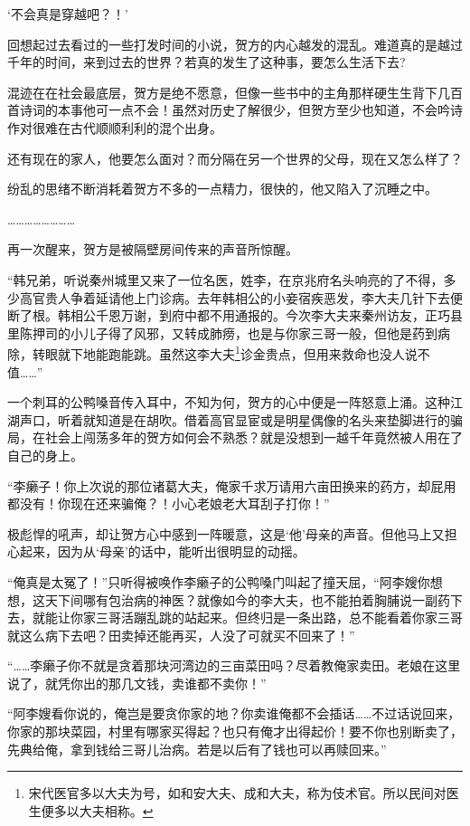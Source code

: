 ‘不会真是穿越吧？！’

回想起过去看过的一些打发时间的小说，贺方的内心越发的混乱。难道真的是越过千年的时间，来到过去的世界？若真的发生了这种事，要怎么生活下去?

混迹在在社会最底层，贺方是绝不愿意，但像一些书中的主角那样硬生生背下几百首诗词的本事他可一点不会！虽然对历史了解很少，但贺方至少也知道，不会吟诗作对很难在古代顺顺利利的混个出身。

还有现在的家人，他要怎么面对？而分隔在另一个世界的父母，现在又怎么样了？

纷乱的思绪不断消耗着贺方不多的一点精力，很快的，他又陷入了沉睡之中。

……………………

再一次醒来，贺方是被隔壁房间传来的声音所惊醒。

“韩兄弟，听说秦州城里又来了一位名医，姓李，在京兆府名头响亮的了不得，多少高官贵人争着延请他上门诊病。去年韩相公的小妾宿疾恶发，李大夫几针下去便断了根。韩相公千恩万谢，到府中都不用通报的。今次李大夫来秦州访友，正巧县里陈押司的小儿子得了风邪，又转成肺痨，也是与你家三哥一般，但他是药到病除，转眼就下地能跑能跳。虽然这李大夫\footnote{宋代医官多以大夫为号，如和安大夫、成和大夫，称为伎术官。所以民间对医生便多以大夫相称。}诊金贵点，但用来救命也没人说不值……”

一个刺耳的公鸭嗓音传入耳中，不知为何，贺方的心中便是一阵怒意上涌。这种江湖声口，听着就知道是在胡吹。借着高官显宦或是明星偶像的名头来垫脚进行的骗局，在社会上闯荡多年的贺方如何会不熟悉？就是没想到一越千年竟然被人用在了自己的身上。

“李癞子！你上次说的那位诸葛大夫，俺家千求万请用六亩田换来的药方，却屁用都没有！你现在还来骗俺？！小心老娘老大耳刮子打你！”

极彪悍的吼声，却让贺方心中感到一阵暖意，这是‘他’母亲的声音。但他马上又担心起来，因为从‘母亲’的话中，能听出很明显的动摇。

“俺真是太冤了！”只听得被唤作李癞子的公鸭嗓门叫起了撞天屈，“阿李嫂你想想，这天下间哪有包治病的神医？就像如今的李大夫，也不能拍着胸脯说一副药下去，就能让你家三哥活蹦乱跳的站起来。但终归是一条出路，总不能看着你家三哥就这么病下去吧？田卖掉还能再买，人没了可就买不回来了！”

“……李癞子你不就是贪着那块河湾边的三亩菜田吗？尽着教俺家卖田。老娘在这里说了，就凭你出的那几文钱，卖谁都不卖你！”

“阿李嫂看你说的，俺岂是要贪你家的地？你卖谁俺都不会插话……不过话说回来，你家的那块菜园，村里有哪家买得起？也只有俺才出得起价！要不你也别断卖了，先典给俺，拿到钱给三哥儿治病。若是以后有了钱也可以再赎回来。”
